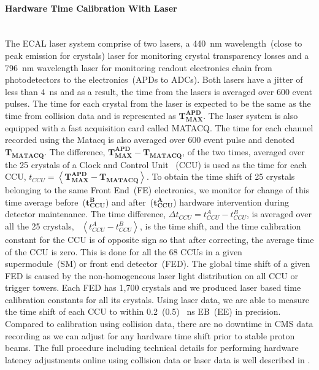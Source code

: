 \paragraph{Hardware Time Calibration With Laser}\mbox{}\\
The ECAL laser system comprise of two lasers, a 440~nm wavelength~(close to peak emission for \pb crystals) laser for monitoring crystal transparency losses and a 796~nm wavelength laser for monitoring readout electronics chain from photodetectors to the electronics~(\ie APDs to ADCs). Both lasers have a jitter of less than 4~ns and as a result, the time from the lasers is averaged over 600 event pulses. The time for each crystal from the laser is expected to be the same as the time from collision data and is represented as $\mathbf{T^{APD}_{MAX}}$. The laser system is also equipped with a fast acquisition card called MATACQ. The time for each channel recorded using the Matacq is also averaged over 600 event pulse and denoted  $\mathbf{T_{MATACQ}}$.
The difference, $ \mathbf{T^{APD}_{MAX}} - \mathbf{T_{MATACQ}}$, of the two times, averaged over the  25 crystals of a Clock and Control Unit ~(CCU) is used as the time for each CCU, $ t_{CCU} = \left\langle \mathbf{T^{APD}_{MAX} - T_{MATACQ}} \right\rangle $. 
To obtain the time shift of 25 crystals belonging to the same Front End~(FE) electronics, we monitor for change of this time average  before~($\mathbf{t^{B}_{CCU}} $) and after~($\mathbf{t^{A}_{CCU}} $) hardware intervention during detector maintenance.  
The time difference, $\Delta t_{CCU} = t^{A}_{CCU} - t^{B}_{CCU}$, is averaged over all the 25 crystals, \ie ~$\left\langle t^{A}_{CCU} - t^{B}_{CCU} \right\rangle $, is the time shift, and the time calibration constant for the CCU is of opposite sign so that after correcting, the average time of the CCU is zero. This is done for all the 68 CCUs in a given supermodule~(SM) or front end detector~(FED). The global time shift of a given FED is caused by the non-homogeneous laser light distribution on all CCU or trigger towers. Each FED has 1,700 \pb crystals and we produced laser based time calibration constants for all its crystals. 
Using laser data, we are able to measure the time shift of each CCU to within 0.2~(0.5)~ ns EB~(EE) in precision. Compared to calibration using collision data, there are no downtime in CMS data recording as we can adjust for any hardware time shift prior to stable proton beams.
The full procedure including technical details for performing hardware latency adjustments online using collision data or laser data is well described in \cite{ECALHW}.

